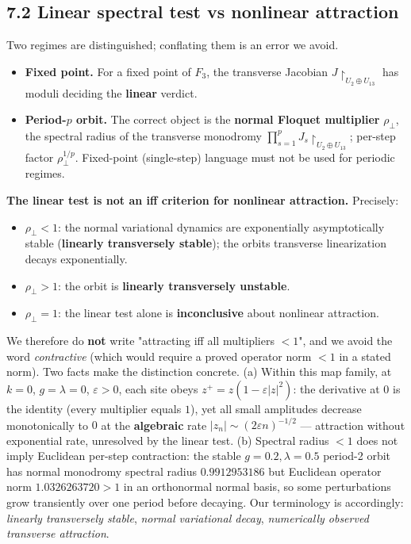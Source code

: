 \documentclass[
  11pt,
  a4paper,
]{article}
\providecommand{\tightlist}{%
  \setlength{\itemsep}{0pt}\setlength{\parskip}{0pt}}
\begin{document}
\subsection{7.2 Linear spectral test vs nonlinear attraction}\label{linear-spectral-test-vs-nonlinear-attraction}

Two regimes are distinguished; conflating them is an error we avoid.

\begin{itemize}
\tightlist
\item
  \textbf{Fixed point.} For a fixed point of \(F_3\), the transverse Jacobian \(J\!\restriction_{U_2\oplus U_{13}}\) has moduli deciding the \textbf{linear} verdict.
\item
  \textbf{Period-\(p\) orbit.} The correct object is the \textbf{normal Floquet multiplier} \(\rho_\perp\), the spectral radius of the transverse monodromy \(\prod_{s=1}^{p}J_s\!\restriction_{U_2\oplus U_{13}}\); per-step factor \(\rho_\perp^{1/p}\). Fixed-point (single-step) language must not be used for periodic regimes.
\end{itemize}

\textbf{The linear test is not an iff criterion for nonlinear attraction.} Precisely:

\begin{itemize}
\tightlist
\item
  \(\rho_\perp<1\): the normal variational dynamics are exponentially asymptotically stable (\textbf{linearly transversely stable}); the orbit\textquotesingle s transverse linearization decays exponentially.
\item
  \(\rho_\perp>1\): the orbit is \textbf{linearly transversely unstable}.
\item
  \(\rho_\perp=1\): the linear test alone is \textbf{inconclusive} about nonlinear attraction.
\end{itemize}

We therefore do \textbf{not} write "attracting iff all multipliers \(<1\)", and we avoid the word \emph{contractive} (which would require a proved operator norm \(<1\) in a stated norm). Two facts make the distinction concrete. (a) Within this map family, at \(k=0\), \(g=\lambda=0\), \(\varepsilon>0\), each site obeys \(z^+=z(1-\varepsilon|z|^2)\): the derivative at \(0\) is the identity (every multiplier equals \(1\)), yet all small amplitudes decrease monotonically to \(0\) at the \textbf{algebraic} rate \(|z_n|\sim(2\varepsilon n)^{-1/2}\) --- attraction without exponential rate, unresolved by the linear test. (b) Spectral radius \(<1\) does not imply Euclidean per-step contraction: the stable \(g=0.2,\lambda=0.5\) period-2 orbit has normal monodromy spectral radius \(0.9912953186\) but Euclidean operator norm \(1.0326263720>1\) in an orthonormal normal basis, so some perturbations grow transiently over one period before decaying. Our terminology is accordingly: \emph{linearly transversely stable}, \emph{normal variational decay}, \emph{numerically observed transverse attraction}.
\end{document}
